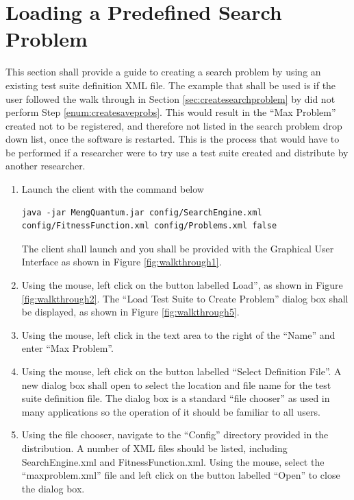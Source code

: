 \section{Loading a Predefined Search Problem}
This section shall provide a guide to creating a search problem by using an existing test suite definition XML file.
The example that shall be used is if the user followed the walk through in Section \ref{sec:createsearchproblem} by did not perform Step \ref{enum:createsaveprobs}.
This would result in the ``Max Problem'' created not to be registered, and therefore not listed in the search problem drop down list, once the software is restarted.
This is the process that would have to be performed if a researcher were to try use a test suite created and distribute by another researcher.

\begin{enumerate}
 \item Launch the client with the command below
\begin{lstlisting}
java -jar MengQuantum.jar config/SearchEngine.xml config/FitnessFunction.xml config/Problems.xml false
\end{lstlisting}
The client shall launch and you shall be provided with the Graphical User Interface as shown in Figure \ref{fig:walkthrough1}.

\item Using the mouse, left click on the button labelled Load'', as shown in Figure \ref{fig:walkthrough2}.
The ``Load Test Suite to Create Problem'' dialog box shall be displayed, as shown in Figure \ref{fig:walkthrough5}.

\item Using the mouse, left click in the text area to the right of the ``Name'' and enter ``Max Problem''.

\item Using the mouse, left click on the button labelled ``Select Definition File''.
A new dialog box shall open to select the location and file name for the test suite definition file.
The dialog box is a standard ``file chooser'' as used in many applications so the operation of it should be familiar to all users.

\item Using the file chooser, navigate to the ``Config'' directory provided in the distribution.
A number of XML files should be listed, including SearchEngine.xml and FitnessFunction.xml.
Using the mouse, select the ``maxproblem.xml'' file and left click on the button labelled ``Open'' to close the dialog box.


\end{enumerate}
